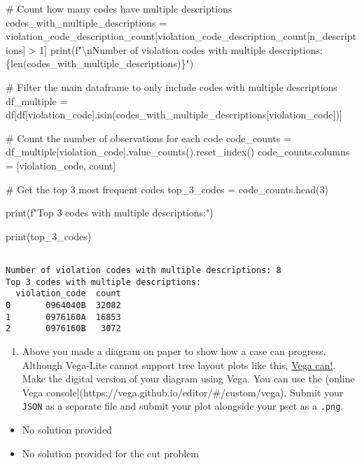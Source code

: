 \documentclass[
  letterpaper,
  DIV=11,
  numbers=noendperiod]{scrartcl}
\newenvironment{Shaded}{\begin{snugshade}}{\end{snugshade}}
\newcommand{\BuiltInTok}[1]{\textcolor[rgb]{0.00,0.23,0.31}{#1}}
\newcommand{\CharTok}[1]{\textcolor[rgb]{0.13,0.47,0.30}{#1}}
\newcommand{\CommentTok}[1]{\textcolor[rgb]{0.37,0.37,0.37}{#1}}
\newcommand{\DecValTok}[1]{\textcolor[rgb]{0.68,0.00,0.00}{#1}}
\newcommand{\NormalTok}[1]{\textcolor[rgb]{0.00,0.23,0.31}{#1}}
\newcommand{\OperatorTok}[1]{\textcolor[rgb]{0.37,0.37,0.37}{#1}}
\newcommand{\SpecialCharTok}[1]{\textcolor[rgb]{0.37,0.37,0.37}{#1}}
\newcommand{\SpecialStringTok}[1]{\textcolor[rgb]{0.13,0.47,0.30}{#1}}
\newcommand{\StringTok}[1]{\textcolor[rgb]{0.13,0.47,0.30}{#1}}
\providecommand{\tightlist}{%
  \setlength{\itemsep}{0pt}\setlength{\parskip}{0pt}}\usepackage{longtable,booktabs,array}
\begin{document}
\begin{Shaded}
\begin{Highlighting}[]
\CommentTok{\# Count how many codes have multiple descriptions}
\NormalTok{codes\_with\_multiple\_descriptions }\OperatorTok{=}\NormalTok{ violation\_code\_description\_count[violation\_code\_description\_count[}\StringTok{\textquotesingle{}n\_descriptions\textquotesingle{}}\NormalTok{] }\OperatorTok{\textgreater{}} \DecValTok{1}\NormalTok{]}
\BuiltInTok{print}\NormalTok{(}\SpecialStringTok{f"}\CharTok{\textbackslash{}n}\SpecialStringTok{Number of violation codes with multiple descriptions: }\SpecialCharTok{\{}\BuiltInTok{len}\NormalTok{(codes\_with\_multiple\_descriptions)}\SpecialCharTok{\}}\SpecialStringTok{"}\NormalTok{)}

\CommentTok{\# Filter the main dataframe to only include codes with multiple descriptions}
\NormalTok{df\_multiple }\OperatorTok{=}\NormalTok{ df[df[}\StringTok{\textquotesingle{}violation\_code\textquotesingle{}}\NormalTok{].isin(codes\_with\_multiple\_descriptions[}\StringTok{\textquotesingle{}violation\_code\textquotesingle{}}\NormalTok{])]}

\CommentTok{\# Count the number of observations for each code}
\NormalTok{code\_counts }\OperatorTok{=}\NormalTok{ df\_multiple[}\StringTok{\textquotesingle{}violation\_code\textquotesingle{}}\NormalTok{].value\_counts().reset\_index()}
\NormalTok{code\_counts.columns }\OperatorTok{=}\NormalTok{ [}\StringTok{\textquotesingle{}violation\_code\textquotesingle{}}\NormalTok{, }\StringTok{\textquotesingle{}count\textquotesingle{}}\NormalTok{]}

\CommentTok{\# Get the top 3 most frequent codes}
\NormalTok{top\_3\_codes }\OperatorTok{=}\NormalTok{ code\_counts.head(}\DecValTok{3}\NormalTok{)}

\BuiltInTok{print}\NormalTok{(}\SpecialStringTok{f"Top 3 codes with multiple descriptions:"}\NormalTok{) }

\BuiltInTok{print}\NormalTok{(top\_3\_codes)}
\end{Highlighting}
\end{Shaded}

\begin{verbatim}

Number of violation codes with multiple descriptions: 8
Top 3 codes with multiple descriptions:
  violation_code  count
0       0964040B  32082
1       0976160A  16853
2       0976160B   3072
\end{verbatim}

\begin{enumerate}
\def\labelenumi{\arabic{enumi}.}
\setcounter{enumi}{1}
\tightlist
\item
  Above you made a diagram on paper to show how a case can progress.
  Although Vega-Lite cannot support tree layout plots like this,
  \href{https://vega.github.io/vega/examples/tree-layout/}{Vega can!}.
  Make the digital version of your diagram using Vega. You can use the
  (online Vega console{]}(https://vega.github.io/editor/\#/custom/vega).
  Submit your \texttt{JSON} as a separate file and submit your plot
  alongside your pset as a \texttt{.png}.
\end{enumerate}

\begin{itemize}
\item
  No solution provided
\item
  No solution provided for the cut problem
\end{itemize}
\end{document}

